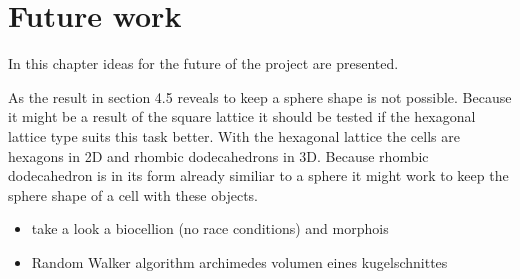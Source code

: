 \chapter{Future work}
In this chapter ideas for the future of the project are presented.

As the result in section 4.5 reveals to keep a sphere shape is not possible. Because it might be a result of the square lattice it should be tested if the hexagonal lattice type suits this task better. With the hexagonal lattice the cells are hexagons in 2D and rhombic dodecahedrons in 3D. Because rhombic dodecahedron is in its form already similiar to a sphere it might work to keep the sphere shape of a cell with these objects.


\begin{itemize}
\item take a look a biocellion (no race conditions) and morphois
\item Random Walker algorithm
\subitem archimedes volumen eines kugelschnittes
\end{itemize}